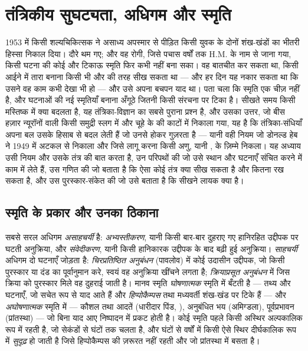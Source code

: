 \chapter{तंत्रिकीय सुघट्यता, अधिगम और स्मृति}\label{ch:b3:learning-memory}

1953 में किसी शल्यचिकित्सक ने असाध्य अपस्मार से पीड़ित किसी युवक के
दोनों शंख-खंडों का भीतरी हिस्सा निकाल दिया। दौरे थम गए; और वह रोगी,
जिसे पचास वर्षों तक H.M. के नाम से जाना गया, किसी घटना की कोई और टिकाऊ
स्मृति फिर कभी नहीं बना सका। वह बातचीत कर सकता था, किसी आईने में तारा
बनाना किसी भी और की तरह सीख सकता था --- और हर दिन यह नकार सकता था कि
उसने वह काम कभी देखा भी हो --- और उसे अपना बचपन याद था। पता चला कि
स्मृति एक चीज़ नहीं है, और घटनाओं की नई स्मृतियाँ बनाना अँगूठे जितनी
किसी संरचना पर टिका है। सीखते समय किसी मस्तिष्क में क्या बदलता है, यह
तंत्रिका-विज्ञान का सबसे पुराना प्रश्न है, और उसका उत्तर, जो बीस हज़ार
न्यूरॉनों वाली किसी समुद्री स्लग में और चूहे के  की काटों
में निकाला गया, यह है कि तंत्रिका-संधियाँ अपना बल उसके हिसाब से बदल
लेती हैं जो उनसे होकर गुज़रता है --- यानी वही नियम जो डोनल्ड हेब ने
1949 में अटकल से निकाला और जिसे लागू करना किसी अणु, यानी ,
के ज़िम्मे निकला। यह अध्याय उसी नियम और उसके तंत्र की बात करता है, उन
परिपथों की जो उसे स्थान और घटनाएँ संचित करने में काम में लेते हैं, उस
गणित की जो बताता है कि ऐसा कोई तंत्र क्या सीख सकता है और कितना रख सकता
है, और उस पुरस्कार-संकेत की जो उसे बताता है कि सीखने लायक क्या है।

\section{स्मृति के प्रकार और उनका ठिकाना}

\begin{definition}[अधिगम और स्मृति के रूप]\label{def:b3:learning-memory:kinds}
सबसे सरल अधिगम \emph{असाहचर्यी} है: \emph{अभ्यस्तीकरण}, यानी किसी
बार-बार दुहराए गए हानिरहित उद्दीपक पर घटती अनुक्रिया, और
\emph{संवेदीकरण}, यानी किसी हानिकारक उद्दीपक के बाद बढ़ी हुई अनुक्रिया।
\emph{साहचर्यी} अधिगम दो घटनाएँ जोड़ता है: \emph{चिरप्रतिष्ठित
अनुबंधन} (पावलोव) में कोई उदासीन उद्दीपक, जो किसी पुरस्कार या दंड का
पूर्वानुमान करे, स्वयं वह अनुक्रिया खींचने लगता है;
\emph{क्रियाप्रसूत अनुबंधन} में जिस क्रिया को पुरस्कार मिले वह
दुहराई जाती है। मानव स्मृति \emph{घोषणात्मक} स्मृति में बँटती है ---
तथ्य और घटनाएँ, जो सचेत रूप से याद आते हैं और \emph{हिप्पोकैम्पस} तथा
मध्यवर्ती शंख-खंड पर टिके हैं --- और \emph{अघोषणात्मक} स्मृति में ---
कौशल तथा आदतें (धारीदार पिंड, ), अनुबंधित भय (अमिग्डला),
पूर्वप्रभावन (प्रांतस्था) --- जो बिना याद आए निष्पादन में प्रकट होती
है। कोई स्मृति पहले किसी अस्थिर अल्पकालिक रूप में रहती है, जो सेकंडों
से घंटों तक चलता है, और घंटों से वर्षों में किसी ऐसे स्थिर दीर्घकालिक
रूप में \emph{सुदृढ़} हो जाती है जिसे हिप्पोकैम्पस की ज़रूरत नहीं रहती
और जो प्रांतस्था में बसता है।
\end{definition}

